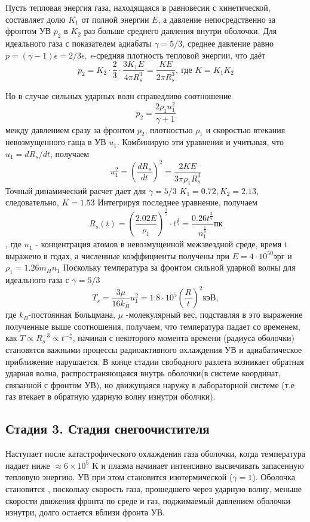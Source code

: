 \documentclass[a4paper,12pt]{extarticle}
\begin{document}
Пусть тепловая энергия газа, находящаяся в равновесии с кинетической, составляет долю $K_1$ от полной энергии $E$, а давление непосредственно за фронтом УВ $p_2$ в $K_2$ раз больше среднего давления внутри оболочки. Для идеального газа с показателем адиабаты $\gamma=5/3$, среднее давление равно $p=(\gamma-1)\epsilon=2/3\epsilon,\  \epsilon$-средняя плотность тепловой энергии, что даёт 
$$p_2=K_2\cdot \frac{2}{3}\cdot \frac{3K_1E}{4\pi R_s^3}=\frac{KE}{2\pi R_s^3},\ \text{где } K=K_1K_2$$

Но в случае сильных ударных волн справедливо соотношение
$$p_2=\frac{2\rho_1u_1^2}{\gamma+1}$$
между давлением сразу за фронтом $p_2$, плотностью $\rho_1$ и скоростью втекания невозмущенного гаща в УВ $u_1$. Комбинирую эти уравнения и учитывая, что $u_1=dR_s/dt$, получаем $$u_1^2=\left(\frac{dR_s}{dt}\right)^2=\frac{2KE}{3\pi \rho_1 R_s^3}$$
Точный динамический расчет дает для $\gamma=5/3$ $K_1=0.72,K_2=2.13$, следовательно, $K=1.53$
Интегрируя последнее уравнение, получаем 
$$R_s(t)=\left(\frac{2.02E}{\rho_1}\right)^{\frac{1}{5}}\cdot t^{\frac{2}{5}}=\frac{0.26t^{\frac{2}{5}}}{n_1^{\frac{1}{5}}} \text{пк}$$,
где $n_1$ - концентрация атомов в невозмущенной межзвездной среде, время t выражено в годах, а численные коэффициенты получены при $E=4\cdot 10^{50}$эрг и $\rho_1=1.26m_Hn_1$ 
Поскольку температура за фронтом сильной ударной волны для идеального газа с $\gamma=5/3$
$$T_s = \frac{3\mu}{16k_B}u_1^2=1.8\cdot 10^5 \left(\frac{R}{t} \right)^2\text{кэВ},$$
где $k_B$-постоянная Больцмана, $\mu$ -молекулярный вес,
подставляя в это выражение полученные выше соотношения, получаем, что температура падает со временем, как 
$T \propto R_s^{-3} \propto t^{-\frac{6}{5}}$, начиная с некоторого момента времени (радиуса оболочки) становятся важными процессы радиоактивного охлаждения УВ и адиабатическое приближение нарушается. 
В конце стадии свободного разлета возникает обратная ударная волна, распространяющаяся внутрь оболочки(в системе координат, связанной с фронтом УВ), но движущаяся наружу в лабораторной системе (т.е газ втекает в обратную ударную волну изнутри оболчки). 

\subsection{Стадия 3. Стадия снегоочистителя}
Наступает после катастрофического охлаждения газа оболочки, когда температура падает ниже $\approx 6\times 10^5$ K и плазма начинает интенсивно высвечивать запасенную тепловую энергию. УВ при этом становится изотермической ($\gamma=1$). 
Оболочка становится , поскольку скорость газа, прошедшего через ударную волну, меньше скорости движения фронта по среде и газ, поджимаемый давлением оболочки изнутри, долго остается вблизи фронта УВ.
\end{document}
